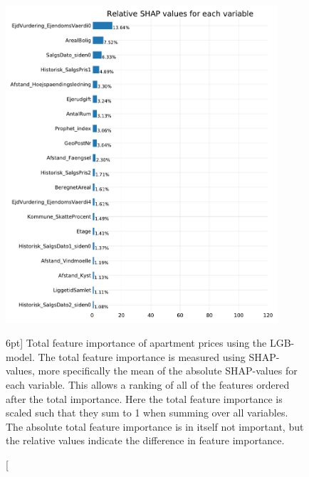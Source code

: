 \documentclass[a4paper, twoside, nobib]{tufte-book}
\begin{document}
\begin{figure}
  \includegraphics[width=0.9\textwidth, trim=0 0 0 40, clip]{figures/housing/Ejerlejlighed_v17_cut_all_Ncols_all_lgb_tight_SHAP_vals_summary_all.pdf}
  \caption[Total feature importance of apartment prices using LGB][6pt]
          {Total feature importance of apartment prices using the LGB-model. The total feature importance is measured using SHAP-values, more specifically the mean of the absolute SHAP-values for each variable. This allows a ranking of all of the features ordered after the total importance. Here the total feature importance is scaled such that they sum to 1 when summing over all variables. The absolute total feature importance is in itself not important, but the relative values indicate the difference in feature importance. 
          } 
  \label{fig:h:shap_overview_total}
\end{figure}
\end{document}
